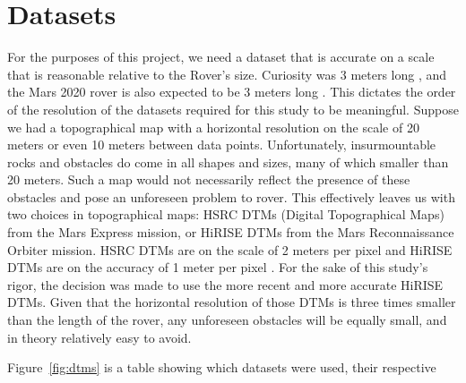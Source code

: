 \documentclass[12pt]{article}
\begin{document}
\section{Datasets}
\label{sec:datasets}
\par For the purposes of this project, we need a dataset that is accurate on a scale that is reasonable relative to the Rover's size. Curiosity was 3 meters long \cite{bib:curiosity}, and the Mars 2020 rover is also expected to be 3 meters long \cite{bib:rover2020}. This dictates the order of the resolution of the datasets required for this study to be meaningful. Suppose we had a topographical map with a horizontal resolution on the scale of 20 meters or even 10 meters between data points. Unfortunately, insurmountable rocks and obstacles do come in all shapes and sizes, many of which smaller than 20 meters. Such a map would not necessarily reflect the presence of these obstacles and pose an unforeseen problem to rover. This effectively leaves us with two choices in topographical maps: HSRC DTMs (Digital Topographical Maps) from the Mars Express mission, or HiRISE DTMs from the Mars Reconnaissance Orbiter mission. HSRC DTMs are on the scale of 2 meters per pixel \cite{bib:hsrc} and HiRISE DTMs are on the accuracy of 1 meter per pixel \cite{bib:abouthirise}. For the sake of this study's rigor, the decision was made to use the more recent and more accurate HiRISE DTMs. Given that the horizontal resolution of those DTMs is three times smaller than the length of the rover, any unforeseen obstacles will be equally small, and in theory relatively easy to avoid.
\par Figure~\ref{fig:dtms} is a table showing which datasets were used, their respective
\end{document}
